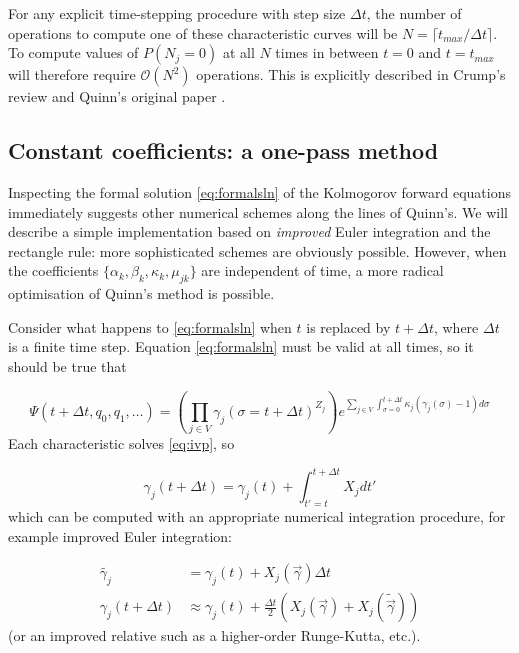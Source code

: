 \documentclass{article}
\begin{document}
For any explicit time-stepping procedure with step size $\Delta t$, the number
of operations to compute one of these characteristic curves will be $N = \lceil
t_{max} / \Delta t \rceil$. To compute values of $P(N_j = 0)$ at all $N$ times
in between $t=0$ and $t=t_{max}$ will therefore require $\mathcal{O}(N^2)$
operations. This is explicitly described in Crump's review and Quinn's original
paper \cite{crump2005numerical,quinn1989calculating}.

\subsection{Constant coefficients: a one-pass method}
\label{sec:flying}

Inspecting the formal solution \eqref{eq:formalsln} of the Kolmogorov forward
equations immediately
suggests other numerical schemes along the lines of Quinn's. We will describe a simple
implementation based on \emph{improved} Euler integration and the rectangle rule: more
sophisticated schemes are obviously possible.
However, when the coefficients $\{\alpha_k, \beta_k, \kappa_k, \mu_{jk}\}$ are
independent of time, a more radical optimisation of Quinn's method is possible.

Consider what happens to \eqref{eq:formalsln} when $t$ is replaced by $t +
\Delta t$, where $\Delta t$ is a finite time step. Equation \eqref{eq:formalsln}
must be valid at all times, so it should be true that

\begin{equation}
    \Psi(t + \Delta t,q_0,q_1,\dots) = \left(\prod_{j \in V}
    \gamma_j(\sigma=t + \Delta t)^{Z_j}\right)
    e^{\sum_{j \in V} \int_{\sigma=0}^{t + \Delta t} \kappa_j (\gamma_j(\sigma)-1) d\sigma}
\end{equation}
Each characteristic solves \eqref{eq:ivp}, so

\begin{equation}
    \gamma_j(t+\Delta t) = \gamma_j(t) + \int_{t'=t}^{t+\Delta t} X_j dt'
\end{equation}
which can be computed with an appropriate numerical integration procedure, for
example improved Euler integration:

\begin{align}
    \tilde{\gamma_j} &= \gamma_j(t) + X_j(\vec{\gamma}) \Delta t \nonumber \\
    \gamma_j(t+\Delta t) &\approx \gamma_j(t) + \frac{\Delta t}{2}
    (X_j(\vec{\gamma}) + X_j(\tilde{\vec{\gamma}}))
\end{align}
(or an improved relative such as a higher-order Runge-Kutta, etc.).
\end{document}
